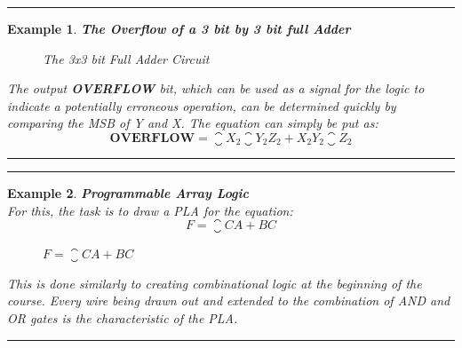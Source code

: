 \documentclass[12pt]{article}
\newtheorem{example}{Example}
\newenvironment{examp}
{
	\vspace{.5cm}
	\hrule
\begin{example}\upshape}
	{\hrule
		\vspace{0.5cm}
\end{example}}
\begin{document}
\begin{examp}
	\vspace{.5mm}
	\textbf{The Overflow of a 3 bit by 3 bit full Adder}\\
	\begin{figure}[H]
		\caption{The 3x3 bit Full Adder Circuit}
	\end{figure}

	The output \textbf{OVERFLOW} bit, which can be used as a signal for the logic
	to indicate a potentially erroneous operation, can be determined quickly by comparing the MSB of Y and
	X. The equation can simply be put as:
	\[
		\mathbf{OVERFLOW} = \closure{X_2}\closure{Y_2}Z_2 + X_{2}Y_{2}\closure{Z_{2}}
	\]

\end{examp}
\begin{examp}
	\vspace{.5mm}
	\textbf{Programmable Array Logic}\\
	For this, the task is to draw a PLA for the equation:
	\[
		F = \closure{C}A + BC
	\]
	\begin{figure}[H]
		\caption{$F = \closure{C}A + BC$}
	\end{figure}
	This is done similarly to creating combinational logic at the beginning of the
	course. Every wire being drawn out and extended to the combination of AND and
	OR gates is the characteristic of the PLA.
	\vspace{5mm}
\end{examp}
\end{document}
